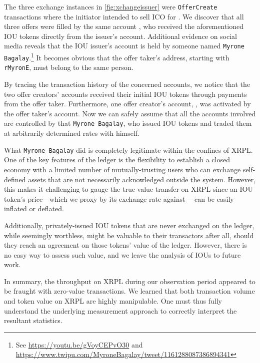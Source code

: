 The three exchange instances in \autoref{fig:xchangeissuer} were \texttt{OfferCreate} transactions where the initiator intended to sell  ICO for . 
We discover that all three offers were filled by the same account , who received the aforementioned  IOU tokens directly from the issuer's account.
Additional evidence on social media reveals that the IOU issuer's account is held by someone named \texttt{Myrone Bagalay}.\footnote{See \url{https://youtu.be/gVoyCEPvO30} and \url{https://www.twipu.com/MyroneBagalay/tweet/1161288087386894341}}
It becomes obvious that the offer taker's address, starting with \texttt{rMyronE}, must belong to the same person.

By tracing the transaction history of the concerned accounts, we notice that the two offer creators' accounts received their initial  IOU tokens through payments from the offer taker. 
Furthermore, one offer creator's account, , was activated by the offer taker's account. 
Now we can safely assume that all the accounts involved are controlled by that \texttt{Myrone Bagalay}, who issued  IOU tokens and traded them at arbitrarily determined rates with himself.

What \texttt{Myrone Bagalay} did is completely legitimate within the confines of XRPL. 
One of the key features of the ledger is the flexibility to establish a closed economy with a limited number of mutually-trusting users who can exchange self-defined assets that are not necessarily acknowledged outside the system. 
However, this makes it challenging to gauge the true value transfer on XRPL since an IOU token's price---which we proxy by its exchange rate against ---can be easily inflated or deflated.

Additionally, privately-issued IOU tokens that are never exchanged on the ledger, while seemingly worthless, might be valuable to their transactors after all, should they reach an agreement on those tokens' value of the ledger. However, there is no easy way to assess such value, and we leave the analysis of IOUs to future work.

In summary, the throughput on XRPL during our observation period appeared to be fraught with zero-value transactions. 
We learned that both transaction volume and token value on XRPL are highly manipulable. 
One must thus fully understand the underlying measurement approach to correctly interpret the resultant statistics.
